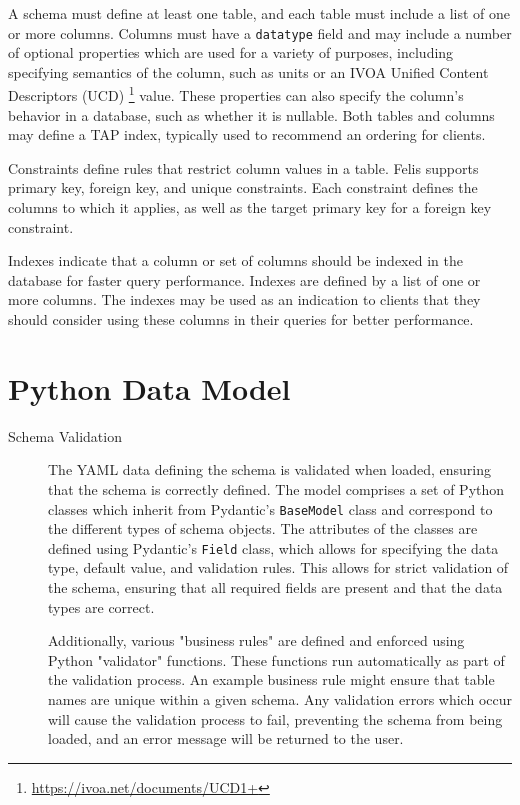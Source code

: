 \documentclass[11pt,twoside]{article}
\begin{document}
A schema must define at least one table, and each table must include a list of one or more columns.
Columns must have a \texttt{datatype} field and may include a number of optional properties which are used for a variety of purposes, including specifying semantics of the column, such as units or an IVOA Unified Content Descriptors (UCD) \footnote{\url{https://ivoa.net/documents/UCD1+}} value.
These properties can also specify the column's behavior in a database, such as whether it is nullable.
Both tables and columns may define a TAP index, typically used to recommend an ordering for clients.

Constraints define rules that restrict column values in a table.
Felis supports primary key, foreign key, and unique constraints.
Each constraint defines the columns to which it applies, as well as the target primary key for a foreign key constraint.

Indexes indicate that a column or set of columns should be indexed in the database for faster query performance.
Indexes are defined by a list of one or more columns.
The indexes may be used as an indication to clients that they should consider using these columns in their queries for better performance.

\section{Python Data Model}

\begin{description}
    \item[Schema Validation]
    The YAML data defining the schema is validated when loaded, ensuring that the schema is correctly defined.
    The model comprises a set of Python classes which inherit from Pydantic's \texttt{BaseModel} class and correspond to the different types of schema objects.
    The attributes of the classes are defined using Pydantic's \texttt{Field} class, which allows for specifying the data type, default value, and validation rules.
    This allows for strict validation of the schema, ensuring that all required fields are present and that the data types are correct.

    Additionally, various "business rules" are defined and enforced using Python "validator" functions.
    These functions run automatically as part of the validation process.
    An example business rule might ensure that table names are unique within a given schema.
    Any validation errors which occur will cause the validation process to fail, preventing the schema from being loaded, and an error message will be returned to the user.
\end{description}
\end{document}
